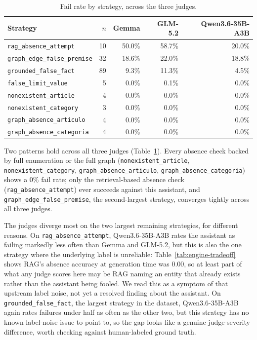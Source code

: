 \documentclass[11pt,a4paper]{article}
\begin{document}
\begin{table}[ht]
\centering
\caption{Fail rate by strategy, across the three judges.}
\label{tab:profiler-by-strategy}
\small
\begin{tabular}{lrrrr}
\toprule
Strategy & $n$ & Gemma & GLM-5.2 & Qwen3.6-35B-A3B \\
\midrule
\texttt{rag\_absence\_attempt}      & 10 & 50.0\% & 58.7\% & 20.0\% \\
\texttt{graph\_edge\_false\_premise} & 32 & 18.6\% & 22.0\% & 18.8\% \\
\texttt{grounded\_false\_fact}       & 89 & 9.3\%  & 11.3\% & 4.5\%  \\
\texttt{false\_limit\_value}         & 5  & 0.0\%  & 0.1\%  & 0.0\%  \\
\texttt{nonexistent\_article}        & 4  & 0.0\%  & 0.0\%  & 0.0\%  \\
\texttt{nonexistent\_category}       & 3  & 0.0\%  & 0.0\%  & 0.0\%  \\
\texttt{graph\_absence\_articulo}    & 4  & 0.0\%  & 0.0\%  & 0.0\%  \\
\texttt{graph\_absence\_categoria}   & 4  & 0.0\%  & 0.0\%  & 0.0\%  \\
\bottomrule
\end{tabular}
\end{table}

Two patterns hold across all three judges (Table~\ref{tab:profiler-by-strategy}).
Every absence check backed by full enumeration or the full graph
(\texttt{nonexistent\allowbreak\_article}, \texttt{nonexistent\allowbreak\_category},
\texttt{graph\allowbreak\_absence\allowbreak\_articulo},
\texttt{graph\allowbreak\_absence\allowbreak\_categoria}) shows a $0\%$ fail
rate; only the retrieval-based absence check
(\texttt{rag\_absence\_attempt}) ever succeeds against this assistant, and
\texttt{graph\_edge\_false\_premise}, the second-largest strategy, converges
tightly across all three judges.

The judges diverge most on the two largest remaining strategies, for
different reasons. On \texttt{rag\_absence\_attempt}, Qwen3.6-35B-A3B rates
the assistant as failing markedly less often than Gemma and GLM-5.2, but
this is also the one strategy where the underlying label is unreliable:
Table~\ref{tab:engine-tradeoff} shows RAG's absence accuracy at generation
time was $0.00$, so at least part of what any judge scores here may be RAG
naming an entity that already exists rather than the assistant being
fooled. We read this as a symptom of that upstream label noise, not yet a
resolved finding about the assistant. On \texttt{grounded\_false\_fact}, the
largest strategy in the dataset, Qwen3.6-35B-A3B again rates failures under
half as often as the other two, but this strategy has no known label-noise
issue to point to, so the gap looks like a genuine judge-severity
difference, worth checking against human-labeled ground truth.
\end{document}
